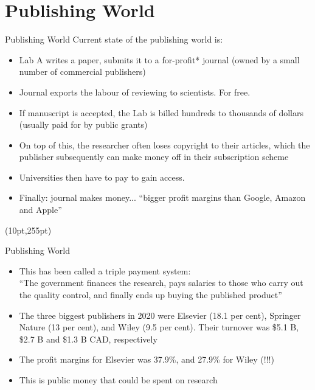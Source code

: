 \documentclass{beamer}
\begin{document}

\section{Publishing World}
\begin{frame}{Publishing World}
	Current state of the publishing world is:
	\begin{itemize}
		\item<2-> Lab A writes a paper, submits it to a for-profit* journal (owned by a small number of commercial publishers)
		\item<3-> Journal exports the labour of reviewing to scientists. For free.
		\item<4-> If manuscript is accepted, the Lab is billed hundreds to thousands of dollars (usually paid for by public grants)
		\item<5-> On top of this, the researcher often loses copyright to their articles, which the publisher subsequently can make money off in their subscription scheme
		\item<6-> Universities then have to pay to gain access.
		\item<7-> Finally: journal makes money... ``bigger profit margins than Google, Amazon and Apple''
	\end{itemize}
	
	\begin{textblock*}{300pt}(10pt,255pt)
		\onslide<2->{\tiny{*: usually}}
	
	\end{textblock*}
		
\end{frame}

\begin{frame}{Publishing World}
\begin{itemize}
	\item This has been called a triple payment system: \\``The government finances the research, pays salaries to those who carry out the quality control, and finally ends up buying the published product''
	\item<2-> The three biggest publishers in 2020 were Elsevier (18.1 per cent), Springer Nature (13 per cent), and Wiley (9.5 per cent). Their turnover was \$5.1 B, \$2.7 B and \$1.3 B CAD, respectively
	\item<3-> The profit margins for Elsevier was 37.9\%, and 27.9\% for Wiley (!!!)
	\item<4-> This is public money that could be spent on research
\end{itemize}
	
\end{frame}
\end{document}
